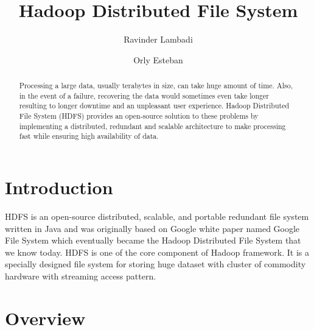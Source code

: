 
\title{Hadoop Distributed File System}

\author{Ravinder Lambadi}


\author{Orly Esteban}

\begin{abstract}
Processing a large data, usually terabytes in size, can take huge
amount of time. Also, in the event of a failure, recovering the
data would sometimes even take longer resulting to longer 
downtime and an unpleasant user experience. Hadoop Distributed
File System (HDFS) provides an open-source solution to these problems
by implementing a distributed, redundant and scalable architecture
to make processing fast while ensuring high availability of data.

\end{abstract}


\maketitle

\section{Introduction}

HDFS is an open-source distributed, scalable, and portable redundant
file system written in Java and was originally based on Google white
paper named Google File System which eventually became the Hadoop
Distributed File System that we know today. HDFS is one of the core 
component of Hadoop framework. It is a specially designed file system 
for storing huge dataset with cluster of commodity hardware with 
streaming access pattern.

 
\section{Overview}
 

